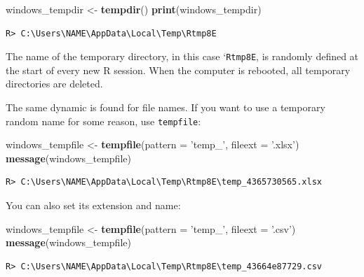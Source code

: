 \documentclass[
  12pt,
]{book}
\newenvironment{Shaded}{\begin{snugshade}}{\end{snugshade}}
\newcommand{\DataTypeTok}[1]{\textcolor[rgb]{0.27,0.27,0.27}{#1}}
\newcommand{\KeywordTok}[1]{\textcolor[rgb]{0.27,0.27,0.27}{\textbf{#1}}}
\newcommand{\NormalTok}[1]{#1}
\newcommand{\StringTok}[1]{\textcolor[rgb]{0.5,0.5,0.5}{#1}}
\begin{document}
\begin{Shaded}
\begin{Highlighting}[]
\NormalTok{windows_tempdir <-}\StringTok{ }\KeywordTok{tempdir}\NormalTok{()}
\KeywordTok{print}\NormalTok{(windows_tempdir)}
\end{Highlighting}
\end{Shaded}

\begin{verbatim}
R> C:\Users\NAME\AppData\Local\Temp\Rtmp8E
\end{verbatim}

The name of the temporary directory, in this case `\texttt{Rtmp8E\textquotesingle{}}, is randomly defined at the start of every new R session. When the computer is rebooted, all temporary directories are deleted.

The same dynamic is found for file names. If you want to use a temporary random name for some reason, use \texttt{tempfile}:

\begin{Shaded}
\begin{Highlighting}[]
\NormalTok{windows_tempfile <-}\StringTok{ }\KeywordTok{tempfile}\NormalTok{(}\DataTypeTok{pattern =} \StringTok{'temp_'}\NormalTok{,}
                             \DataTypeTok{fileext =} \StringTok{'.xlsx'}\NormalTok{)}
\KeywordTok{message}\NormalTok{(windows_tempfile)}
\end{Highlighting}
\end{Shaded}

\begin{verbatim}
R> C:\Users\NAME\AppData\Local\Temp\Rtmp8E\temp_4365730565.xlsx
\end{verbatim}

You can also set its extension and name:

\begin{Shaded}
\begin{Highlighting}[]
\NormalTok{windows_tempfile <-}\StringTok{ }\KeywordTok{tempfile}\NormalTok{(}\DataTypeTok{pattern =} \StringTok{'temp_'}\NormalTok{, }
                             \DataTypeTok{fileext =} \StringTok{'.csv'}\NormalTok{)}
\KeywordTok{message}\NormalTok{(windows_tempfile)}
\end{Highlighting}
\end{Shaded}

\begin{verbatim}
R> C:\Users\NAME\AppData\Local\Temp\Rtmp8E\temp_43664e87729.csv
\end{verbatim}
\end{document}
